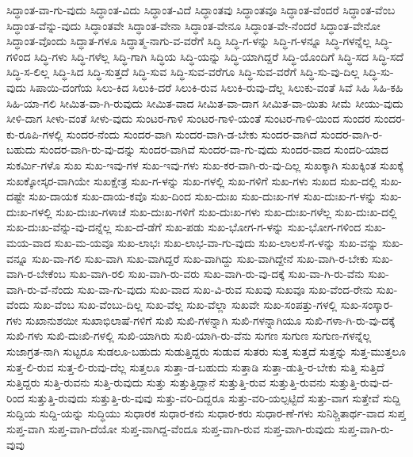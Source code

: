 {ಸಿದ್ಧಾಂತ-ವಾ-ಗು-ವುದು
ಸಿದ್ಧಾಂತ-ವಿದು
ಸಿದ್ಧಾಂತ-ವಿದೆ
ಸಿದ್ಧಾಂತವು
ಸಿದ್ಧಾಂತವೂ
ಸಿದ್ಧಾಂತ-ವೆಂದರೆ
ಸಿದ್ಧಾಂತ-ವೆಂಬ
ಸಿದ್ಧಾಂತ-ವೆನ್ನು-ವುದು
ಸಿದ್ಧಾಂತವೇ
ಸಿದ್ಧಾಂತ-ವೇನಾ
ಸಿದ್ಧಾಂತ-ವೇನೂ
ಸಿದ್ಧಾಂತ-ವೇ-ನೆಂದರೆ
ಸಿದ್ಧಾಂತ-ವೇನೋ
ಸಿದ್ಧಾಂತ-ವೊಂದು
ಸಿದ್ಧಾತ-ಗಳೂ
ಸಿದ್ಧಾತ್ಮ-ನಾಗು-ವ-ವರೆಗೆ
ಸಿದ್ಧಿ
ಸಿದ್ಧಿ-ಗ-ಳನ್ನು
ಸಿದ್ಧಿ-ಗ-ಳನ್ನೂ
ಸಿದ್ಧಿ-ಗಳನ್ನೆಲ್ಲ
ಸಿದ್ಧಿ-ಗಳಿಂದ
ಸಿದ್ಧಿ-ಗಳು
ಸಿದ್ಧಿ-ಗಳೆಲ್ಲ
ಸಿದ್ಧಿ-ಗಾಗಿ
ಸಿದ್ಧಿಯ
ಸಿದ್ಧಿ-ಯನ್ನು
ಸಿದ್ಧಿ-ಯಾಗಿದ್ದರೆ
ಸಿದ್ಧಿ-ಯೊಂದಿಗೆ
ಸಿದ್ಧಿ-ಸದ
ಸಿದ್ಧಿ-ಸದೆ
ಸಿದ್ಧಿ-ಸ-ಲಿಲ್ಲ
ಸಿದ್ಧಿ-ಸಿದ
ಸಿದ್ಧಿ-ಸುತ್ತದೆ
ಸಿದ್ಧಿ-ಸುವ
ಸಿದ್ಧಿ-ಸುವ-ವರೆಗೂ
ಸಿದ್ಧಿ-ಸುವ-ವರೆಗೆ
ಸಿದ್ಧಿ-ಸು-ವು-ದಿಲ್ಲ
ಸಿದ್ಧಿ-ಸು-ವುದು
ಸಿಪಾಯಿ-ದಂಗೆಯ
ಸಿಲು-ಕಿದ
ಸಿಲುಕಿ-ದರೆ
ಸಿಲುಕಿ-ರುವ
ಸಿಲುಕಿ-ರುವು-ದೆಲ್ಲ
ಸಿಲುಕು-ವಂತೆ
ಸಿವೆ
ಸಿಹಿ
ಸಿಹಿ-ಕಹಿ
ಸಿಹಿ-ಯಾ-ಗಲಿ
ಸೀಮಿತ-ವಾ-ಗಿ-ರುವುದು
ಸೀಮಿತ-ವಾದ
ಸೀಮಿತ-ವಾ-ದಾಗ
ಸೀಮಿತ-ವಾ-ಯಿತು
ಸೀಮೆ
ಸೀಯು-ವುದು
ಸೀಳಿ-ದಾಗ
ಸೀಳು-ವಂತೆ
ಸೀಳು-ವುದು
ಸುಂಟರ-ಗಾಳಿ
ಸುಂಟರ-ಗಾಳಿ-ಯಂತೆ
ಸುಂಟರ-ಗಾಳಿ-ಯಿಂದ
ಸುಂದರ
ಸುಂದರ-ಕು-ರೂಪಿ-ಗಳಲ್ಲಿ
ಸುಂದರ-ನೆಂದು
ಸುಂದರ-ವಾಗಿ
ಸುಂದರ-ವಾಗಿ-ಡ-ಬೇಕು
ಸುಂದರ-ವಾಗಿದೆ
ಸುಂದರ-ವಾಗಿ-ರ-ಬಹುದು
ಸುಂದರ-ವಾಗಿ-ರು-ವು-ದನ್ನು
ಸುಂದರ-ವಾಗಿವೆ
ಸುಂದರ-ವಾ-ಗು-ವುದು
ಸುಂದರ-ವಾದ
ಸುಂದರಿ-ಯಾದ
ಸುಕರ್ಮಿ-ಗಳೊ
ಸುಖ
ಸುಖ-ಇವು-ಗಳ
ಸುಖ-ಇವು-ಗಳು
ಸುಖ-ಕರ-ವಾಗಿ-ರು-ವು-ದಿಲ್ಲ
ಸುಖಕ್ಕಾಗಿ
ಸುಖಕ್ಕಿಂತ
ಸುಖಕ್ಕೆ
ಸುಖಕ್ಕೋಸ್ಕರ-ವಾಗಿಯೇ
ಸುಖಕ್ಷೇತ್ರ
ಸುಖ-ಗ-ಳನ್ನು
ಸುಖ-ಗಳಲ್ಲಿ
ಸುಖ-ಗಳಿಗೆ
ಸುಖ-ಗಳು
ಸುಖದ
ಸುಖ-ದಲ್ಲಿ
ಸುಖ-ದಷ್ಟೇ
ಸುಖ-ದಾಯಕ
ಸುಖ-ದಾಯ-ಕವೊ
ಸುಖ-ದಿಂದ
ಸುಖ-ದುಃಖ
ಸುಖ-ದುಃಖ-ಗಳ
ಸುಖ-ದುಃಖ-ಗ-ಳನ್ನು
ಸುಖ-ದುಃಖ-ಗಳಲ್ಲಿ
ಸುಖ-ದುಃಖ-ಗಳಾಚೆ
ಸುಖ-ದುಃಖ-ಗಳಿಗೆ
ಸುಖ-ದುಃಖ-ಗಳು
ಸುಖ-ದುಃಖ-ಗಳೆಲ್ಲ
ಸುಖ-ದುಃಖ-ದಲ್ಲಿ
ಸುಖ-ದುಃಖ-ವೆನ್ನು-ವು-ದನ್ನೆಲ್ಲ
ಸುಖ-ದೆ-ಡೆಗೆ
ಸುಖ-ಪಡು
ಸುಖ-ಭೋಗ-ಗ-ಳನ್ನು
ಸುಖ-ಭೋಗ-ಗಳಿಂದ
ಸುಖ-ಮಯ-ವಾದ
ಸುಖ-ಮ-ಯವೂ
ಸುಖ-ಲಾಭಃ
ಸುಖ-ಲಾಭ-ವಾ-ಗು-ವುದು
ಸುಖ-ಲಾಲಸೆ-ಗ-ಳನ್ನು
ಸುಖ-ವನ್ನು
ಸುಖ-ವನ್ನೂ
ಸುಖ-ವಾ-ಗಲಿ
ಸುಖ-ವಾಗಿ
ಸುಖ-ವಾಗಿದ್ದರೆ
ಸುಖ-ವಾಗಿದ್ದು
ಸುಖ-ವಾಗಿದ್ದೇನೆ
ಸುಖ-ವಾಗಿ-ರ-ಬೇಕು
ಸುಖ-ವಾಗಿ-ರ-ಬೇಕೆಂಬ
ಸುಖ-ವಾಗಿ-ರಲಿ
ಸುಖ-ವಾಗಿ-ರು-ವರು
ಸುಖ-ವಾಗಿ-ರು-ವು-ದಕ್ಕೆ
ಸುಖ-ವಾ-ಗಿ-ರು-ವೆನು
ಸುಖ-ವಾಗಿ-ರು-ವೆ-ನೆಂದು
ಸುಖ-ವಾ-ಗು-ವುದು
ಸುಖ-ವಾದ
ಸುಖ-ವಿ-ರುವ
ಸುಖವು
ಸುಖವೂ
ಸುಖ-ವೆಂದ-ರೇನು
ಸುಖ-ವೆಂದು
ಸುಖ-ವೆಂಬ
ಸುಖ-ವೆಂಬು-ದಿಲ್ಲ
ಸುಖ-ವೆಲ್ಲ
ಸುಖ-ವೆಲ್ಲಾ
ಸುಖವೇ
ಸುಖ-ಸಂಪತ್ತು-ಗಳಲ್ಲಿ
ಸುಖ-ಸಂಸ್ಕಾರ-ಗಳು
ಸುಖಾನುಶಯೀ
ಸುಖಾಭಿಲಾಷೆ-ಗಳಿಗೆ
ಸುಖಿ
ಸುಖಿ-ಗಳನ್ನಾಗಿ
ಸುಖಿ-ಗಳನ್ನಾಗಿಯೂ
ಸುಖಿ-ಗಳಾ-ಗಿ-ರು-ವು-ದಕ್ಕೆ
ಸುಖಿ-ಗಳು
ಸುಖಿ-ದುಃಖಿ-ಗಳಲ್ಲಿ
ಸುಖಿ-ಯಾಗಿರು
ಸುಖಿ-ಯಾಗಿ-ರು-ವೆನು
ಸುಗಣ
ಸುಗುಣ
ಸುಗುಣ-ಗಳನ್ನೆಲ್ಲ
ಸುಜಾಗ್ರತ-ನಾಗಿ
ಸುಟ್ಟರೂ
ಸುಡಲೂ-ಬಹುದು
ಸುಡುತ್ತಿದ್ದರು
ಸುಡುವ
ಸುತರು
ಸುತ್ತ
ಸುತ್ತದೆ
ಸುತ್ತನ್ನು
ಸುತ್ತ-ಮುತ್ತಲೂ
ಸುತ್ತ-ಲಿ-ರುವ
ಸುತ್ತ-ಲಿ-ರುವು-ದೆಲ್ಲ
ಸುತ್ತಲೂ
ಸುತ್ತಾ-ಡ-ಬಹುದು
ಸುತ್ತಾಡಿ
ಸುತ್ತಾ-ಡುತ್ತಿ-ರ-ಬೇಕು
ಸುತ್ತಿ
ಸುತ್ತಿದೆ
ಸುತ್ತಿದ್ದರು
ಸುತ್ತಿ-ರುವನು
ಸುತ್ತಿ-ರುವುದು
ಸುತ್ತು
ಸುತ್ತುತ್ತಿದ್ದಾನೆ
ಸುತ್ತುತ್ತಿ-ರುವ
ಸುತ್ತುತ್ತಿ-ರುವನು
ಸುತ್ತುತ್ತಿ-ರುವು-ದ-ರಿಂದ
ಸುತ್ತುತ್ತಿ-ರುವುದು
ಸುತ್ತುತ್ತಿ-ರು-ವುವು
ಸುತ್ತು-ವರಿ-ದಿದ್ದರೂ
ಸುತ್ತು-ವರಿ-ಯಲ್ಪಟ್ಟಿದೆ
ಸುತ್ತು-ವಾಗ
ಸುತ್ತೇವೆ
ಸುದ್ದಿ
ಸುದ್ದಿಯ
ಸುದ್ದಿ-ಯನ್ನು
ಸುದ್ಧಿಯು
ಸುಧಾರಕ
ಸುಧಾರ-ಕನು
ಸುಧಾರ-ಕರು
ಸುಧಾರ-ಣೆ-ಗಳು
ಸುನಿಶ್ಚಿತಾರ್ಥ-ವಾದ
ಸುಪ್ತ
ಸುಪ್ತ-ವಾಗಿ
ಸುಪ್ತ-ವಾಗಿ-ದೆಯೋ
ಸುಪ್ತ-ವಾಗಿದ್ದ-ವೆಂದೂ
ಸುಪ್ತ-ವಾಗಿ-ರುವ
ಸುಪ್ತ-ವಾಗಿ-ರುವುದು
ಸುಪ್ತ-ವಾಗಿ-ರು-ವುವು
}
